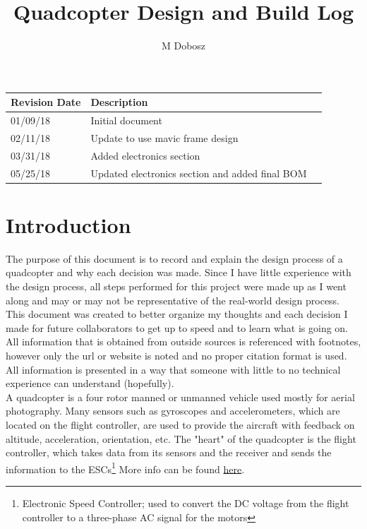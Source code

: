 \documentclass[12pt]{article}
\title{Quadcopter Design and Build Log}
\author{M Dobosz}
\begin{document}
\begin{titlepage}
\vspace*{-4.5cm}
\hspace*{-4.1cm}
{\let\newpage\relax\maketitle}

\begin{table}[b]
\begin{center}
\begin{tabular}{| l | l | l |}
\hline
\textbf{Revision Date} & \textbf{Description} \\ \hline
01/09/18 & Initial document \\ \hline
02/11/18 & Update to use mavic frame design \\ \hline
03/31/18 & Added electronics section \\ \hline
05/25/18 & Updated electronics section and added final BOM
\end{tabular}
\end{center}
\end{table}
\end{titlepage}


\pagebreak
\tableofcontents
\pagebreak

\section{Introduction}

The purpose of this document is to record and explain the design process of a quadcopter and why each decision was made. Since I have little experience with the design process, all steps performed for this project were made up as I went along and may or may not be representative of the real-world design process. This document was created to better organize my thoughts and each decision I made for future collaborators to get up to speed and to learn what is going on. All information that is obtained from outside sources is referenced with footnotes, however only the url or website is noted and no proper citation format is used. All information is presented in a way that someone with little to no technical experience can understand (hopefully).
\\

A quadcopter is a four rotor manned or unmanned vehicle used mostly for aerial photography. Many sensors such as gyroscopes and accelerometers, which are located on the flight controller, are used to provide the aircraft with feedback on altitude, acceleration, orientation, etc. The "heart" of the quadcopter is the flight controller, which takes data from its sensors and the receiver and sends the information to the ESCs\footnote{Electronic Speed Controller; used to convert the DC voltage from the flight controller to a three-phase AC signal for the motors} More info can be found \href{https://en.wikipedia.org/wiki/Quadcopter}{\color{cyan}here}.
\\
\end{document}
